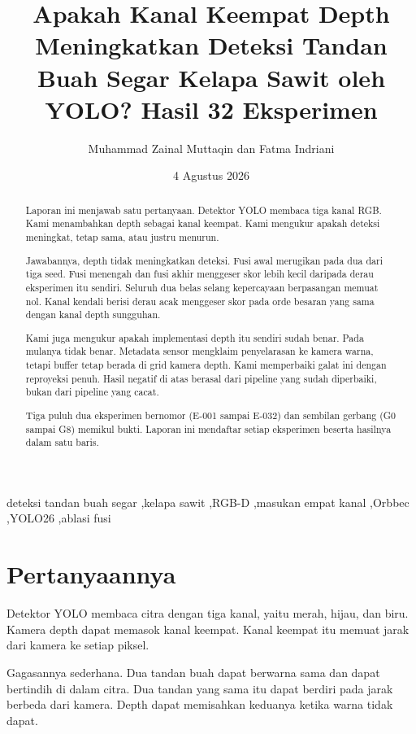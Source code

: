 \documentclass[preprint,12pt]{elsarticle}
\title{Apakah Kanal Keempat Depth Meningkatkan Deteksi Tandan Buah Segar
Kelapa Sawit oleh YOLO? Hasil 32 Eksperimen}
\author{Muhammad Zainal Muttaqin dan Fatma Indriani}
\date{4 Agustus 2026}
\newcommand{\E}[1]{E-#1}
\newcommand{\G}[1]{G#1}
\begin{document}
\begin{frontmatter}
\maketitle

\begin{abstract}
Laporan ini menjawab satu pertanyaan. Detektor YOLO membaca tiga kanal RGB.
Kami menambahkan depth sebagai kanal keempat. Kami mengukur apakah deteksi
meningkat, tetap sama, atau justru menurun.

Jawabannya, depth tidak meningkatkan deteksi. Fusi awal merugikan pada dua
dari tiga seed. Fusi menengah dan fusi akhir menggeser skor lebih kecil
daripada derau eksperimen itu sendiri. Seluruh dua belas selang kepercayaan
berpasangan memuat nol. Kanal kendali berisi derau acak menggeser skor pada
orde besaran yang sama dengan kanal depth sungguhan.

Kami juga mengukur apakah implementasi depth itu sendiri sudah benar. Pada
mulanya tidak benar. Metadata sensor mengklaim penyelarasan ke kamera warna,
tetapi buffer tetap berada di grid kamera depth. Kami memperbaiki galat ini
dengan reproyeksi penuh. Hasil negatif di atas berasal dari pipeline yang sudah
diperbaiki, bukan dari pipeline yang cacat.

Tiga puluh dua eksperimen bernomor (\E{001} sampai \E{032}) dan sembilan
gerbang (\G{0} sampai \G{8}) memikul bukti. Laporan ini mendaftar setiap
eksperimen beserta hasilnya dalam satu baris.
\end{abstract}

\begin{keyword}
deteksi tandan buah segar \sep kelapa sawit \sep RGB-D \sep masukan empat kanal
\sep Orbbec \sep YOLO26 \sep ablasi fusi
\end{keyword}
\end{frontmatter}

\section{Pertanyaannya}
\label{sec:question}

Detektor YOLO membaca citra dengan tiga kanal, yaitu merah, hijau, dan biru.
Kamera depth dapat memasok kanal keempat. Kanal keempat itu memuat jarak dari
kamera ke setiap piksel.

Gagasannya sederhana. Dua tandan buah dapat berwarna sama dan dapat bertindih
di dalam citra. Dua tandan yang sama itu dapat berdiri pada jarak berbeda dari
kamera. Depth dapat memisahkan keduanya ketika warna tidak dapat.
\end{document}

